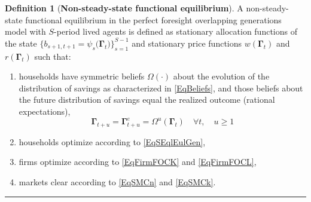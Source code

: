 \documentclass[letterpaper,12pt]{article}
\theoremstyle{definition}
\newtheorem{definition}[theorem]{Definition}
\numberwithin{equation}{section}
\numberwithin{exercise}{section}
\begin{document}
      \begin{definition}[\textbf{Non-steady-state functional equilibrium}]\label{DefSperSimpNSSEql}
         A non-steady-state functional equilibrium in the perfect foresight overlapping generations model with $S$-period lived agents is defined as stationary allocation functions of the state $\bigl\{b_{s+1,t+1}=\psi_{s}\bigl(\bm{\Gamma}_t\bigr)\bigr\}_{s=1}^{S-1}$ and stationary price functions $w(\bm{\Gamma}_t)$ and $r(\bm{\Gamma}_t)$ such that:
         \begin{enumerate}
            \item households have symmetric beliefs $\Omega(\cdot)$ about the evolution of the distribution of savings as characterized in \eqref{EqBeliefs}, and those beliefs about the future distribution of savings equal the realized outcome (rational expectations),
               \begin{equation*}
                  \bm{\Gamma}_{t+u} = \bm{\Gamma}^e_{t+u} = \Omega^u\left(\bm{\Gamma}_t\right) \quad\forall t,\quad u\geq 1
               \end{equation*}
            \item households optimize according to \eqref{EqSEqlEulGen},
            \item firms optimize according to \eqref{EqFirmFOCK} and \eqref{EqFirmFOCL},
            \item markets clear according to \eqref{EqSMCn} and \eqref{EqSMCk}.
         \end{enumerate}
      \end{definition}
      \vspace{-2mm}
      \hrule
      \vspace{5mm}
\end{document}
